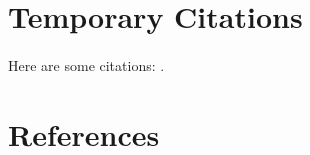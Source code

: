 \documentclass{article}
\begin{document}
    \section{Temporary Citations}
    \paragraph{}Here are some citations: \cite{Axelrod1390}\cite{Nowak1992}\cite{Hauert2004}.
    
    \section{References}
    
    
\end{document}

